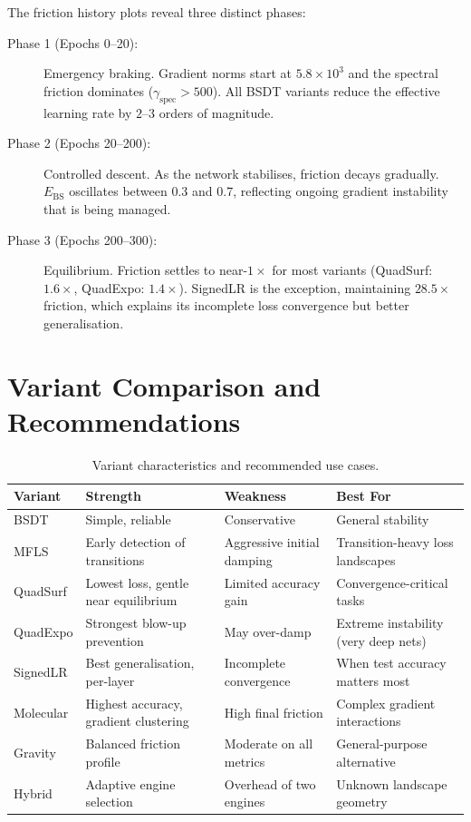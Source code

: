 \documentclass[11pt,a4paper]{article}
\begin{document}
The friction history plots reveal three distinct phases:

\begin{description}
  \item[Phase 1 (Epochs 0--20):] Emergency braking.  Gradient norms start at $5.8 \times 10^3$ and the spectral friction dominates ($\gamma_{\mathrm{spec}} > 500$).  All BSDT variants reduce the effective learning rate by $2$--$3$ orders of magnitude.

  \item[Phase 2 (Epochs 20--200):] Controlled descent.  As the network stabilises, friction decays gradually.  $E_{\mathrm{BS}}$ oscillates between 0.3 and 0.7, reflecting ongoing gradient instability that is being managed.

  \item[Phase 3 (Epochs 200--300):] Equilibrium.  Friction settles to near-$1\times$ for most variants (QuadSurf: $1.6\times$, QuadExpo: $1.4\times$).  SignedLR is the exception, maintaining $28.5\times$ friction, which explains its incomplete loss convergence but better generalisation.
\end{description}

\section{Variant Comparison and Recommendations}

\begin{table}[H]
\centering
\caption{Variant characteristics and recommended use cases.}
\label{tab:recommendations}
\begin{tabular}{@{}llll@{}}
\toprule
\textbf{Variant} & \textbf{Strength} & \textbf{Weakness} & \textbf{Best For} \\
\midrule
BSDT        & Simple, reliable         & Conservative    & General stability \\
MFLS        & Early detection of transitions & Aggressive initial damping & Transition-heavy loss landscapes \\
QuadSurf    & Lowest loss, gentle near equilibrium & Limited accuracy gain & Convergence-critical tasks \\
QuadExpo    & Strongest blow-up prevention & May over-damp    & Extreme instability (very deep nets) \\
SignedLR    & Best generalisation, per-layer & Incomplete convergence & When test accuracy matters most \\
Molecular   & Highest accuracy, gradient clustering & High final friction & Complex gradient interactions \\
Gravity     & Balanced friction profile & Moderate on all metrics & General-purpose alternative \\
Hybrid      & Adaptive engine selection & Overhead of two engines & Unknown landscape geometry \\
\bottomrule
\end{tabular}
\end{table}
\end{document}
